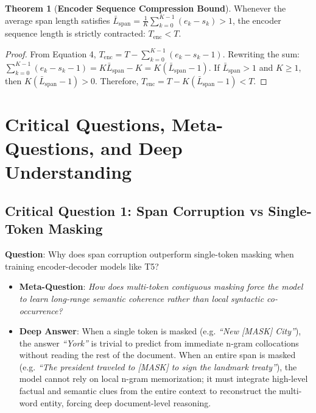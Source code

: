 \documentclass[11pt,a4paper]{article}
\theoremstyle{definition}
\newtheorem{theorem}{\textbf{Theorem}}[section]
\begin{document}
\begin{theorem}[\textbf{Encoder Sequence Compression Bound}]
Whenever the average span length satisfies $\bar{L}_{\text{span}} = \frac{1}{K}\sum_{k=0}^{K-1}(e_k - s_k) > 1$, the encoder sequence length is strictly contracted: $T_{\text{enc}} < T$.
\end{theorem}

\begin{proof}
From Equation 4, $T_{\text{enc}} = T - \sum_{k=0}^{K-1} (e_k - s_k - 1)$.
Rewriting the sum: $\sum_{k=0}^{K-1} (e_k - s_k - 1) = K \bar{L}_{\text{span}} - K = K(\bar{L}_{\text{span}} - 1)$.
If $\bar{L}_{\text{span}} > 1$ and $K \ge 1$, then $K(\bar{L}_{\text{span}} - 1) > 0$.
Therefore, $T_{\text{enc}} = T - K(\bar{L}_{\text{span}} - 1) < T$.
\end{proof}

\section{Critical Questions, Meta-Questions, and Deep Understanding}

\subsection{\textbf{Critical Question 1: Span Corruption vs Single-Token Masking}}
\textbf{Question}: Why does span corruption outperform single-token masking when training encoder-decoder models like T5?
\begin{itemize}
    \item \textbf{Meta-Question}: \emph{How does multi-token contiguous masking force the model to learn long-range semantic coherence rather than local syntactic co-occurrence?}
    \item \textbf{Deep Answer}: When a single token is masked (e.g. \emph{``New [MASK] City''}), the answer \emph{``York''} is trivial to predict from immediate n-gram collocations without reading the rest of the document. When an entire span is masked (e.g. \emph{``The president traveled to [MASK] to sign the landmark treaty''}), the model cannot rely on local n-gram memorization; it must integrate high-level factual and semantic clues from the entire context to reconstruct the multi-word entity, forcing deep document-level reasoning.
\end{itemize}
\end{document}
